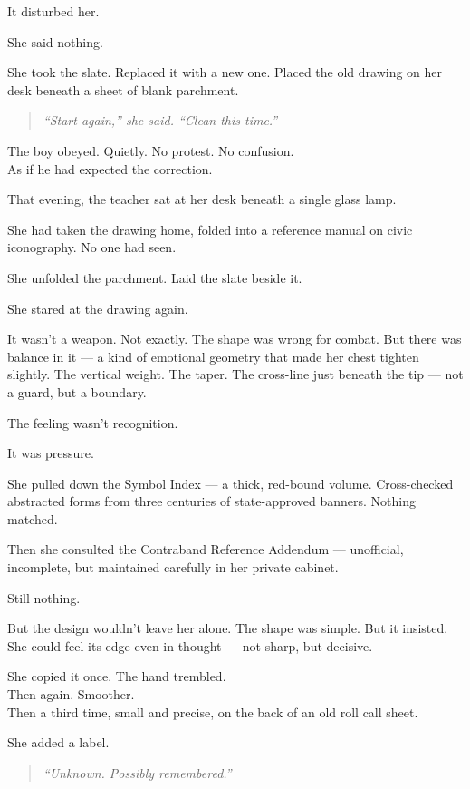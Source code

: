 \documentclass[9pt]{article}
\begin{document}
It disturbed her.

She said nothing.

She took the slate. Replaced it with a new one. Placed the old drawing on her desk beneath a sheet of blank parchment.

\begin{quote}
\textit{“Start again,” she said. “Clean this time.”}
\end{quote}

The boy obeyed. Quietly. No protest. No confusion.\\
As if he had expected the correction.

\vspace{1em}

That evening, the teacher sat at her desk beneath a single glass lamp.

She had taken the drawing home, folded into a reference manual on civic iconography. No one had seen.

She unfolded the parchment. Laid the slate beside it.

She stared at the drawing again.

It wasn’t a weapon. Not exactly. The shape was wrong for combat. But there was balance in it --- a kind of emotional geometry that made her chest tighten slightly. The vertical weight. The taper. The cross-line just beneath the tip --- not a guard, but a boundary.

The feeling wasn’t recognition.

It was pressure.

She pulled down the Symbol Index --- a thick, red-bound volume. Cross-checked abstracted forms from three centuries of state-approved banners. Nothing matched.

Then she consulted the Contraband Reference Addendum --- unofficial, incomplete, but maintained carefully in her private cabinet.

Still nothing.

But the design wouldn't leave her alone. The shape was simple. But it insisted. She could feel its edge even in thought --- not sharp, but decisive.

She copied it once. The hand trembled.\\
Then again. Smoother.\\
Then a third time, small and precise, on the back of an old roll call sheet.

She added a label.

\begin{quote}
\textit{“Unknown. Possibly remembered.”}
\end{quote}
\end{document}
